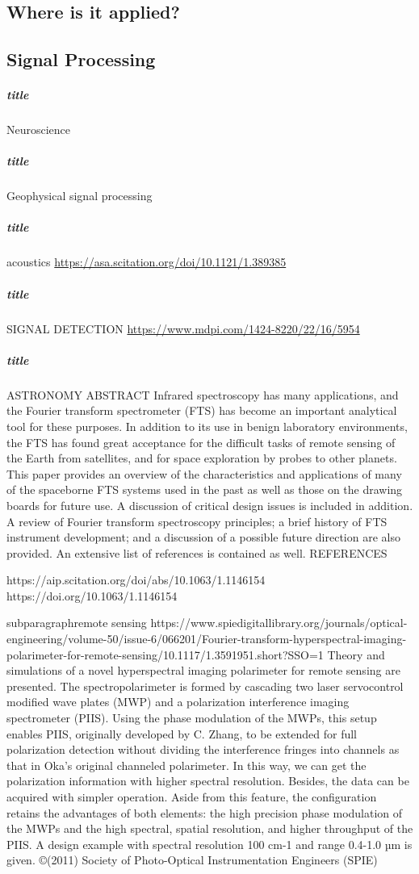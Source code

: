 \documentclass[ams,fleqn,amsmath,amssymb]{article}
\begin{document}
\begin{}
  
  \section{Where is it applied?}
  
  \subsection{Signal Processing}
  \subparagraph*{title}{Neuroscience}
  \subparagraph*{title}{Geophysical signal processing}
  \subparagraph*{title}{acoustics}
  \url{https://asa.scitation.org/doi/10.1121/1.389385}
  \subparagraph*{title}{SIGNAL DETECTION}
  \url{https://www.mdpi.com/1424-8220/22/16/5954}
  \subparagraph*{title}{ASTRONOMY}
  ABSTRACT
  Infrared spectroscopy has many applications, and the Fourier transform spectrometer (FTS) has become an important analytical tool for these purposes. In addition to its use in benign laboratory environments, the FTS has found great acceptance for the difficult tasks of remote sensing of the Earth from satellites, and for space exploration by probes to other planets. This paper provides an overview of the characteristics and applications of many of the spaceborne FTS systems used in the past as well as those on the drawing boards for future use. A discussion of critical design issues is included in addition. A review of Fourier transform spectroscopy principles; a brief history of FTS instrument development; and a discussion of a possible future direction are also provided. An extensive list of references is contained as well.
  REFERENCES
  
  https://aip.scitation.org/doi/abs/10.1063/1.1146154
  https://doi.org/10.1063/1.1146154
  
  subparagraph{remote sensing}
  https://www.spiedigitallibrary.org/journals/optical-engineering/volume-50/issue-6/066201/Fourier-transform-hyperspectral-imaging-polarimeter-for-remote-sensing/10.1117/1.3591951.short?SSO=1
  Theory and simulations of a novel hyperspectral imaging polarimeter for remote sensing are presented. The spectropolarimeter is formed by cascading two laser servocontrol modified wave plates (MWP) and a polarization interference imaging spectrometer (PIIS). Using the phase modulation of the MWPs, this setup enables PIIS, originally developed by C. Zhang, to be extended for full polarization detection without dividing the interference fringes into channels as that in Oka's original channeled polarimeter. In this way, we can get the polarization information with higher spectral resolution. Besides, the data can be acquired with simpler operation. Aside from this feature, the configuration retains the advantages of both elements: the high precision phase modulation of the MWPs and the high spectral, spatial resolution, and higher throughput of the PIIS. A design example with spectral resolution 100 cm-1 and range 0.4-1.0 µm is given.
  ©(2011) Society of Photo-Optical Instrumentation Engineers (SPIE)
  

\end{}
\end{document}
